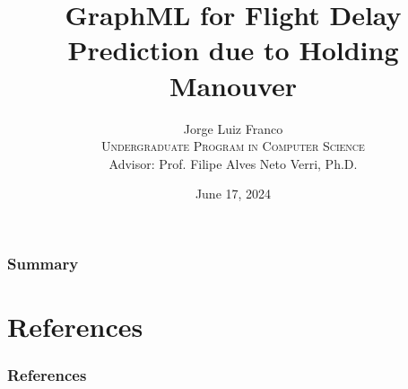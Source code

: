 \documentclass[aspectratio=169,dvipsnames]{beamer}
\title[GraphML for Flight Delay Prediction due to Holding Manouver
]{GraphML for Flight Delay Prediction due to Holding Manouver
}
\author[Jorge Luiz Franco]{Jorge Luiz Franco\\ \bigskip
\textsc{Undergraduate Program in Computer Science}\\ \bigskip
Advisor: Prof. Filipe Alves Neto Verri, Ph.D.}
\institute[ICMC/USP]{Universidade de São Paulo - ICMC}
\date[2024]{\footnotesize{June 17, 2024}}
\begin{document}
    
    \begin{frame}[plain]
        \titlepage
    \end{frame}
    
    \begin{frame}
      \frametitle{Summary}
      \tableofcontents
    \end{frame}
    














\section{References}

\begin{frame}[allowframebreaks]
  \frametitle{References}
  
  
  
\end{frame}
\end{document}
